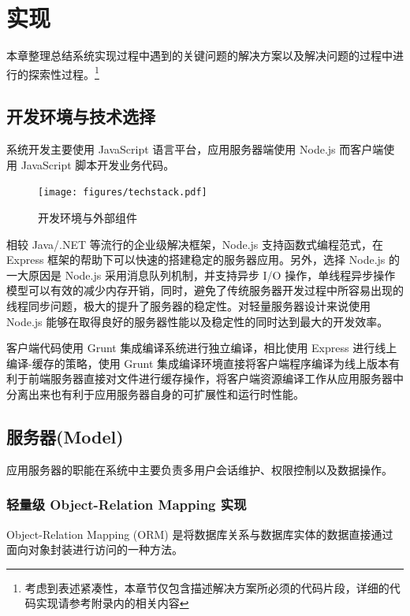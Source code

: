 \chapter{实现}

本章整理总结系统实现过程中遇到的关键问题的解决方案以及解决问题的过程中进行的探索性过程。\footnote{考虑到表述紧凑性，本章节仅包含描述解决方案所必须的代码片段，详细的代码实现请参考附录内的相关内容}

\section{开发环境与技术选择}

系统开发主要使用 JavaScript 语言平台，应用服务器端使用 Node.js 而客户端使用 JavaScript 脚本开发业务代码。

\begin{figure}[!h]
  \begin{center}
    \texttt{[image: figures/techstack.pdf]}
    \caption{开发环境与外部组件\label{TechStack}}
  \end{center}
\end{figure}

相较 Java/.NET 等流行的企业级解决框架，Node.js 支持函数式编程范式，在 Express 框架的帮助下可以快速的搭建稳定的服务器应用。另外，选择 Node.js 的一大原因是 Node.js 采用消息队列机制，并支持异步 I/O 操作，单线程异步操作模型可以有效的减少内存开销，同时，避免了传统服务器开发过程中所容易出现的线程同步问题，极大的提升了服务器的稳定性。对轻量服务器设计来说使用 Node.js 能够在取得良好的服务器性能以及稳定性的同时达到最大的开发效率。

客户端代码使用 Grunt 集成编译系统进行独立编译，相比使用 Express 进行线上编译-缓存的策略，使用 Grunt 集成编译环境直接将客户端程序编译为线上版本有利于前端服务器直接对文件进行缓存操作，将客户端资源编译工作从应用服务器中分离出来也有利于应用服务器自身的可扩展性和运行时性能。

\section{服务器(Model)}

应用服务器的职能在系统中主要负责多用户会话维护、权限控制以及数据操作。

\subsection{轻量级 Object-Relation Mapping 实现}

Object-Relation Mapping (ORM) 是将数据库关系与数据库实体的数据直接通过面向对象封装进行访问的一种方法。

